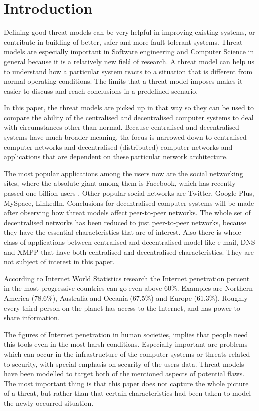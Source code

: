\section{Introduction}
Defining good threat models can be very helpful in improving existing systems, or contribute in building of better, safer and more fault tolerant systems. Threat models are especially important in Software engineering and Computer Science in general because it is a relatively new field of research. A threat model can help us to understand how a particular system reacts to a situation that is different from normal operating conditions. The limits that a threat model imposes makes it easier to discuss and reach conclusions in a predefined scenario.

In this paper, the threat models are picked up in that way so they can be used to compare the ability of the centralised and decentralised computer systems to deal with circumstances other than normal. Because centralised and decentralised systems have much broader meaning, the focus is narrowed down to centralised computer networks and decentralised (distributed) computer networks and applications that are dependent on these particular network architecture. 

The most popular applications among the users now are the social networking sites, where the absolute giant among them is Facebook, which has recently passed one billion users \cite{web:facebookpassesbillion}. Other popular social networks are Twitter, Google Plus, MySpace, LinkedIn. Conclusions for decentralised computer systems will be made after observing how threat models affect peer-to-peer networks. The whole set of decentralised networks has been reduced to just peer-to-peer networks, because they have the essential characteristics that are of interest. Also there is whole class of applications between centralised and decentralised model like e-mail, DNS and XMPP that have both centralised and decentralised characteristics. They are not subject of interest in this paper.

According to Internet World Statistics research \cite{web:internetworldstats} the Internet penetration percent in the most progressive countries can go even above 60\%. Examples are Northern America (78.6\%), Australia and Oceania (67.5\%) and Europe (61.3\%). Roughly every third person on the planet has access to the Internet, and has power to share information. 

The figures of Internet penetration \cite{web:internetworldstats} in human societies, implies that people need this tools even in the most harsh conditions. Especially important are problems which can occur in the infrastructure of the computer systems or threats related to security, with special emphasis on security of the users data. Threat models have been modelled to target both of the mentioned aspects of potential flaws. The most important thing is that this paper does not capture the whole picture of a threat, but rather than that certain characteristics had been taken to model the newly occurred situation.

